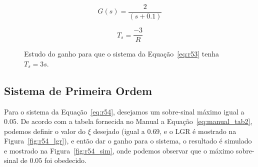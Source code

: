 \documentclass[a4paper]{article}
\begin{document}
\begin{equation}
   G(s)=\frac{2}{(s+0.1)}
   \label{eq:r53}
\end{equation}

\begin{equation}
   T_s=\frac{-3}{R}
   \label{eq:manual_tab1}
\end{equation}

\begin{figure}[h]
   \caption{Estudo do ganho para que o sistema da Equação~\ref{eq:r53} tenha $T_s=3s$.}
   \label{fig:r53}
\end{figure}

\subsection{Sistema de Primeira Ordem}
Para o sistema da Equação~\ref{eq:r54}, desejamos um sobre-sinal máximo igual a $0.05$.
De acordo com a tabela fornecida no Manual a Equação~\ref{eq:manual_tab2},
podemos definir o valor do $\xi$ desejado (igual a $0.69$, e o LGR é mostrado na
Figura~\ref{fig:r54_lgr}), e então dar o ganho para o sistema,
o resultado é simulado e mostrado na Figura~\ref{fig:r54_sim}, onde
podemos observar que o máximo sobre-sinal de $0.05$ foi obedecido.
\end{document}
